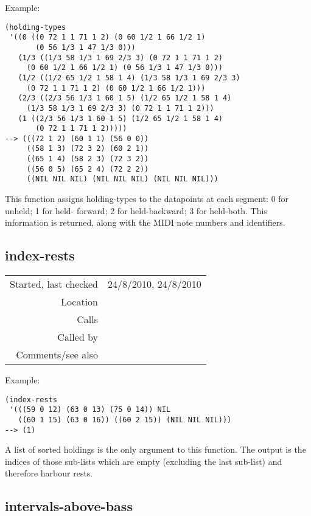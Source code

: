 \vspace{0.5cm}
\noindent Example:
\begin{verbatim}
(holding-types
 '((0 ((0 72 1 1 71 1 2) (0 60 1/2 1 66 1/2 1)
       (0 56 1/3 1 47 1/3 0)))
   (1/3 ((1/3 58 1/3 1 69 2/3 3) (0 72 1 1 71 1 2)
	 (0 60 1/2 1 66 1/2 1) (0 56 1/3 1 47 1/3 0)))
   (1/2 ((1/2 65 1/2 1 58 1 4) (1/3 58 1/3 1 69 2/3 3)
	 (0 72 1 1 71 1 2) (0 60 1/2 1 66 1/2 1)))
   (2/3 ((2/3 56 1/3 1 60 1 5) (1/2 65 1/2 1 58 1 4)
	 (1/3 58 1/3 1 69 2/3 3) (0 72 1 1 71 1 2)))
   (1 ((2/3 56 1/3 1 60 1 5) (1/2 65 1/2 1 58 1 4)
       (0 72 1 1 71 1 2)))))
--> (((72 1 2) (60 1 1) (56 0 0))
     ((58 1 3) (72 3 2) (60 2 1))
     ((65 1 4) (58 2 3) (72 3 2))
     ((56 0 5) (65 2 4) (72 2 2))
     ((NIL NIL NIL) (NIL NIL NIL) (NIL NIL NIL)))
\end{verbatim}

\noindent This function assigns holding-types to the
datapoints at each segment: 0 for unheld; 1 for held-
forward; 2 for held-backward; 3 for held-both. This
information is returned, along with the MIDI note
numbers and identifiers.


\subsection*{index-rests}\label{fun:index-rests}

\vspace{0.3cm}
\begin{tabular}{r|p{8cm}}
Started, last checked & 24/8/2010, 24/8/2010 \\
Location & \nameref{sec:spacing-states} \\
Calls & \\
Called by & \nameref{fun:spacing-holding-states} \\
Comments/see also &
\end{tabular}

\vspace{0.5cm}
\noindent Example:
\begin{verbatim}
(index-rests
 '(((59 0 12) (63 0 13) (75 0 14)) NIL
   ((60 1 15) (63 0 16)) ((60 2 15)) (NIL NIL NIL)))
--> (1)
\end{verbatim}

\noindent A list of sorted holdings is the only
argument to this function. The output is the indices
of those sub-lists which are empty (excluding the last
sub-list) and therefore harbour rests.


\subsection*{intervals-above-bass}\label{fun:intervals-above-bass}

